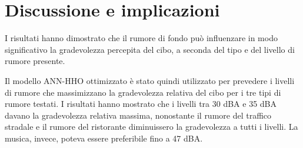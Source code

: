 \section{Discussione e implicazioni}
\noindent

I risultati hanno dimostrato che il rumore di fondo può influenzare in modo significativo la gradevolezza percepita del cibo, a seconda del tipo e del livello di rumore presente.

Il modello ANN-HHO ottimizzato è stato quindi utilizzato per prevedere i livelli di rumore che massimizzano la gradevolezza relativa del cibo per i tre tipi di rumore testati. I risultati hanno mostrato che i livelli tra 30 dBA e 35 dBA davano la gradevolezza relativa massima, nonostante il rumore del traffico stradale e il rumore del ristorante diminuissero la gradevolezza a tutti i livelli. La musica, invece, poteva essere preferibile fino a 47 dBA.

